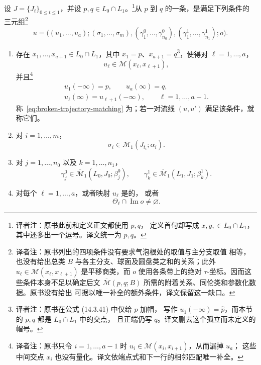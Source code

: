 \begin{definition}
\label{def:stable-broken-floer-trajectory}
设 $J=\{J_t\}_{0\leq t\leq1}$，并设
$p,q\in L_0\cap L_1$。\footnote{译者注：原书此前和定义正文都使用 $p,q$，
定义首句却写成 $x,y,\in L_0\cap L_1$，其中还多出一个逗号。译文统一为
$p,q$。}从 $p$ 到 $q$ 的一条\termStableBrokenFloerTrajectory{}，是满足下列条件的
三元组\footnote{译者注：原书列出的四项条件没有要求气泡根处的取值与主分支取值
相等，也没有给出总类 $B$ 与各主分支、球面及圆盘类之和的关系；此外
$u_\ell\in\mathcal M(x_\ell,x_{\ell+1})$ 是平移商类，而 $o$ 使用各条带上的绝对
$\tau$-坐标。因而这些条件本身不足以确定后文
$\overline{\mathcal M}(p,q;B)$ 所需的附着关系、同伦类和参数化数据。原书没有给出
可据以唯一补全的额外条件，译文保留这一缺口。}
\[
  u
  =
  \bigl(
    (u_1,\ldots,u_a);
    (\sigma_1,\ldots,\sigma_m),
    (\gamma_1^0,\ldots,\gamma_{n_0}^0),
    (\gamma_1^1,\ldots,\gamma_{n_1}^1);
    o
  \bigr).
\]
\begin{enumerate}
  \item 存在
  $x_1,\ldots,x_{a+1}\in L_0\cap L_1$，其中
  $x_1=p$、$x_{a+1}=q$\footnote{译者注：原书在公式 (14.3.41) 中仅给 $p$ 加帽，
  写作 $u_1(-\infty)=\widehat p$，而本节的 $p,q$ 都是 $L_0\cap L_1$ 中的交点，
  且正端仍写 $q$。译文删去这个孤立而未定义的帽号。}，使得对
  $\ell=1,\ldots,a$，
  \[
    u_\ell\in\mathcal M(x_\ell,x_{\ell+1}),
  \]
  并且\footnote{译者注：原书只令
  $i=1,\ldots,a-1$ 时 $u_i\in\mathcal M(x_i,x_{i+1})$，从而漏掉 $u_a$；
  这些中间交点 $x_i$ 也没有量化。译文依端点式和下一行的相邻匹配唯一补全。}
  \begin{equation}
    \begin{gathered}
      u_1(-\infty)=p,
      \qquad
      u_a(\infty)=q,\\
      u_\ell(\infty)=u_{\ell+1}(-\infty),
      \qquad \ell=1,\ldots,a-1.
    \end{gathered}
  \label{eq:broken-trajectory-matching}
  \end{equation}
  称~\eqref{eq:broken-trajectory-matching} 为\termMatchingCondition{}；若一对\personFloer{}流线 $(u,u')$ 满足该条件，就称它们\termGluable{}。

  \item 对 $i=1,\ldots,m$，
  \[
    \sigma_i\in\overline{\mathcal M}_1(J_{t_i};\alpha_i).
  \]

  \item 对 $j=1,\ldots,n_0$ 以及 $k=1,\ldots,n_1$，
  \[
    \gamma_j^0
    \in\overline{\mathcal M}_1(L_0,J_0;\beta_j^0),
    \qquad
    \gamma_k^1
    \in\overline{\mathcal M}_1(L_1,J_1;\beta_k^1).
  \]

  \item 对每个 $\ell=1,\ldots,a$，或者映射 $u_\ell$ 是\termNonStationary{}的，
  或者
  \[
    \Theta_\ell\cap\operatorname{Im}o\neq\varnothing.
  \]
\end{enumerate}
\end{definition}

